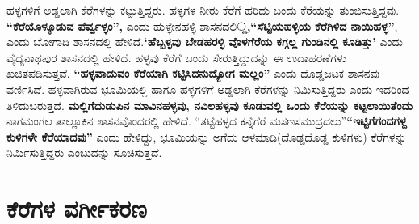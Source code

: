 ಹಳ್ಳಗಳಿಗೆ ಅಡ್ಡಲಾಗಿ ಕೆರೆಗಳನ್ನು ಕಟ್ಟುತ್ತಿದ್ದರು. ಹಳ್ಳಗಳ ನೀರು ಕೆರೆಗೆ ಹರಿದು ಬಂದು ಕೆರೆಯನ್ನು ತುಂಬಿಸುತ್ತಿದ್ದವು. \textbf{“ಕೆರೆಯೊಳ್ಕೂಡುವ ಪೆರ್ವ್ವಳ್ಳಂ”, }ಎಂದು ಹುಳ್ಳೇನಹಳ್ಳಿ ಶಾಸನದಲಿ\textbf{್ಲ,}\textbf{“ಸೆಟ್ಟಿಯಹಳ್ಳಿಯ ಕೆರೆಗಿಳಿದ ನಾಯಿಹಳ್ಳ”}, ಎಂದು ಬೋಗಾದಿ ಶಾಸನದಲ್ಲಿ ಹೇಳಿದೆ.\textbf{‘ಹೆಬ್ಬಳ್ಳವು ಬೇಡಹರಳ್ಳಿ ವೊಳಗೆರೆಯ ಕಗ್ಗಲ್ಲ ಗುಂಡಿನಲ್ಲಿ ಕೂಡಿತ್ತು’} ಎಂದು ವೈದ್ಯನಾಥಪುರ ಶಾಸನದಲ್ಲಿ ಹೇಳಿದೆ. ಹಳ್ಳವು ಕೆರೆಗೆ ಬಂದು ಸೇರುತ್ತಿದ್ದುದನ್ನು ಈ ಉದಾಹರಣೆಗಳು ಖಚಿತಪಡಿಸುತ್ತವೆ. \textbf{“ಹಳ್ಳವಾದುವಂ ಕೆರೆಯಾಗಿ ಕಟ್ಟಿಸಿದನುದ್ಯೋಗ ಮಲ್ಲಂ”} ಎಂದು ದೊಡ್ಡಜಟಕ ಶಾಸನವು ವರ್ಣಿಸಿದೆ. ಹಳ್ಳವಾಗಿರುವ ಭೂಮಿಯಲ್ಲಿ ಹಾಗೂ ಹಳ್ಳಗಳಿಗೆ ಅಡ್ಡಲಾಗಿ ಕೆರೆಗಳನ್ನು ನಿಮಿಸುತ್ತಿದ್ದರು ಎಂದು ಇದರಿಂದ ತಿಳಿದುಬರುತ್ತದೆ. \textbf{ಮಲ್ಲಿಗೆದುಡುಪಿನ ಮಾವಿನಹಳ್ಳವು, ನವಿಲಹಳ್ಳವು ಕೂಡುವಲ್ಲಿ ಒಂದು ಕೆರೆಯನ್ನು ಕಟ್ಟಲಾಯಿತೆಂದು }ನಾಗಮಂಗಲ ತಾಲ್ಲೂಕಿನ ಶಾಸನವೊಂದರಲ್ಲಿ ಹೇಳಿದೆ. “ತಟ್ಟೆಹಳ್ಳದ ಕನ್ನೆಗೆರೆ ಮಸಣಸಮುದ್ರದಲು”\textbf{“ಇಟ್ಟಿಗೆಗಂದಗಳ್ದ ಕುಳಿಗಳೇ ಕೆರೆಯಾದವು”} ಎಂದು ಹೇಳಿದ್ದು, ಭೂಮಿಯನ್ನು ಅಗೆದು ಆಳಮಾಡಿ(ದೊಡ್ಡದೊಡ್ಡ ಕುಳಿಗಳು) ಕೆರೆಗಳನ್ನು ನಿರ್ಮಿಸುತ್ತಿದ್ದರು ಎಂಬುದನ್ನು ಸೂಚಿಸುತ್ತದೆ.


\section{ಕೆರೆಗಳ ವರ್ಗೀಕರಣ}


